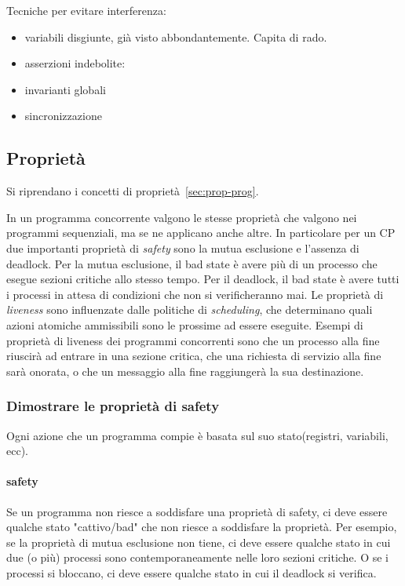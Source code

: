 \documentclass[10pt,a4paper]{book}
\begin{document}
Tecniche per evitare interferenza:
\begin{itemize}
\item variabili disgiunte, già visto abbondantemente. Capita di rado.
\item asserzioni indebolite: 
\item invarianti globali
\item sincronizzazione
\end{itemize}

\subsection{Proprietà}
Si riprendano i concetti di proprietà~\vref{sec:prop-prog}.

In un programma concorrente valgono le stesse proprietà che valgono nei programmi sequenziali, ma se ne applicano anche altre. In particolare per un CP due importanti proprietà di \textit{safety} sono la mutua 
esclusione e l'assenza di deadlock. Per la mutua esclusione, il bad state è avere più di un processo che esegue sezioni critiche allo stesso tempo.
Per il deadlock, il bad state è avere tutti i processi in attesa di condizioni che non si verificheranno mai.
Le proprietà di \textit{liveness} sono influenzate dalle politiche di \textit{scheduling}, che determinano quali azioni atomiche ammissibili sono le prossime ad essere eseguite.
Esempi di proprietà di liveness dei programmi concorrenti sono che un processo alla fine riuscirà ad entrare in una sezione critica, che una richiesta di servizio alla fine sarà onorata, o che un messaggio alla fine raggiungerà la sua destinazione.

\subsubsection{Dimostrare le proprietà di safety}
Ogni azione che un programma compie è basata sul suo stato(registri, variabili, ecc). 
\paragraph{safety}Se un programma non riesce a soddisfare una proprietà di safety, ci deve essere qualche stato "cattivo/bad" che non riesce a soddisfare la proprietà.
Per esempio, se la proprietà di mutua esclusione non tiene, ci deve essere qualche stato in cui due (o più) processi sono contemporaneamente nelle loro sezioni critiche.
O se i processi si bloccano, ci deve essere qualche stato in cui il deadlock si verifica.
\end{document}
